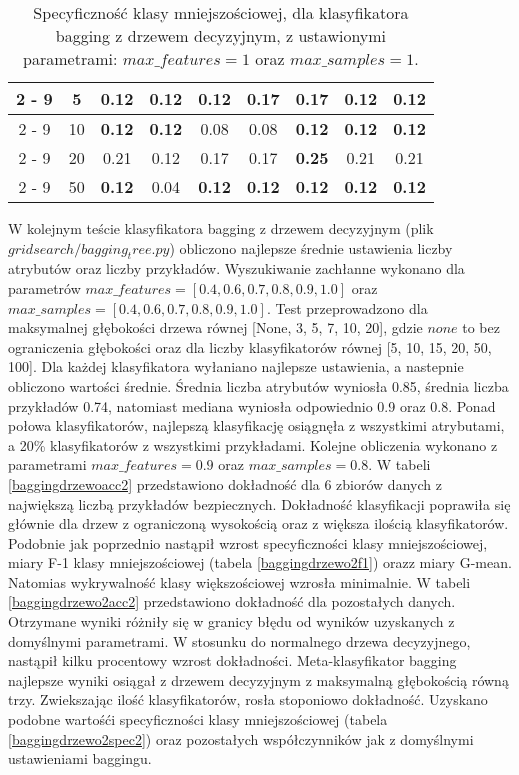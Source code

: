 \begin{table}[H]
\begin{center}
{\begin{tabular}{c|c|ccccccc}
				\cline{2%
					-%
					9}%
				&5&0.12&0.12&0.12&\textbf{0.17}&\textbf{0.17}&0.12&0.12\\%
				\cline{2%
					-%
					9}%
				&10&\textbf{0.12}&\textbf{0.12}&0.08&0.08&\textbf{0.12}&\textbf{0.12}&\textbf{0.12}\\%
				\cline{2%
					-%
					9}%
				&20&0.21&0.12&0.17&0.17&\textbf{0.25}&0.21&0.21\\%
				\cline{2%
					-%
					9}%
				&50&\textbf{0.12}&0.04&\textbf{0.12}&\textbf{0.12}&\textbf{0.12}&\textbf{0.12}&\textbf{0.12}\\%
				\hline%
			\end{tabular}}
			\caption{Specyficzność klasy mniejszościowej, dla klasyfikatora bagging z drzewem decyzyjnym, z ustawionymi parametrami: $max\_features = 1$ oraz $max\_samples = 1$.}
			\label{baggingdrzewospec}
		\end{center}
	\end{table}
\par
W kolejnym teście klasyfikatora bagging z drzewem decyzyjnym (plik $gridsearch/bagging_tree.py$) obliczono najlepsze średnie ustawienia liczby atrybutów oraz liczby przykładów. Wyszukiwanie zachłanne wykonano dla parametrów $max\_features=[0.4, 0.6, 0.7, 0.8, 0.9, 1.0]$ oraz $max\_samples=[0.4, 0.6, 0.7, 0.8, 0.9, 1.0]$. Test przeprowadzono dla maksymalnej głębokości drzewa równej [None, 3, 5, 7, 10, 20], gdzie $none$ to bez ograniczenia głębokości oraz dla liczby klasyfikatorów równej [5, 10, 15, 20, 50, 100]. Dla każdej klasyfikatora wyłaniano najlepsze ustawienia, a nastepnie obliczono wartości średnie. Średnia liczba atrybutów wyniosła 0.85, średnia liczba przykładów 0.74, natomiast mediana wyniosła odpowiednio 0.9 oraz 0.8. Ponad połowa klasyfikatorów, najlepszą klasyfikację osiągnęła z wszystkimi atrybutami, a 20\% klasyfikatorów z wszystkimi przykładami. Kolejne obliczenia wykonano z parametrami $max\_features = 0.9$ oraz $max\_samples = 0.8$. W tabeli \ref{baggingdrzewoacc2} przedstawiono dokładność dla 6 zbiorów danych z największą liczbą przykładów bezpiecznych. Dokładność klasyfikacji poprawiła się głównie dla drzew z ograniczoną wysokością oraz z większa ilością klasyfikatorów. Podobnie jak poprzednio nastąpił wzrost specyficzności klasy mniejszościowej, miary F-1 klasy mniejszościowej (tabela \ref{baggingdrzewo2f1}) orazz miary G-mean. Natomias wykrywalność klasy większościowej wzrosła minimalnie. W tabeli \ref{baggingdrzewo2acc2} przedstawiono dokładność dla pozostałych danych. Otrzymane wyniki różniły się w granicy błędu od wyników uzyskanych z domyślnymi parametrami. W stosunku do normalnego drzewa decyzyjnego, nastąpił kilku procentowy wzrost dokładności. Meta-klasyfikator bagging najlepsze wyniki osiągał z drzewem decyzyjnym z maksymalną głębokością równą trzy. Zwiekszając ilość klasyfikatorów, rosła stoponiowo dokładność. Uzyskano podobne wartośći specyficzności klasy mniejszościowej (tabela \ref{baggingdrzewo2spec2}) oraz pozostałych współczynników jak z domyślnymi ustawieniami baggingu.

